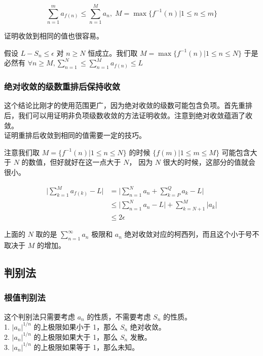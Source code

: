 \[ \sum_{n=1}^{m}a_{f(n)} \le \sum_{n=1}^{M}a_{n}, \; M = \max \{f^{-1}(n) \vert 1 \le n \le m \} \]

证明收敛到相同的值也很容易。

假设 $ L - S_n  \le \epsilon $ 对 $n \ge N$ 恒成立。我们取 $M = \max \{f^{-1}(n) \vert 1 \le n \le N \} $ 
于是必然有 $ \forall n \ge M, \sum_{n=1}^{N} \le \sum_{n=1}^{M}a_{f(n)} \le L $

\subsubsection{绝对收敛的级数重排后保持收敛}
这个结论比刚才的使用范围更广，因为绝对收敛的级数可能包含负项。首先重排后，我们可以用证明非负项级数收敛的方法证明收敛。注意到绝对收敛蕴涵了收敛。\\
证明重排后收敛到相同的值需要一定的技巧。

注意我们取 $M = \{ f^{-1}(n) \vert 1 \le n \le N \} $ 的时候 $ \{ f(m) \vert 1 \le m \le M \}$ 可能包含大于 $N$ 的数值，但好就好在这一点大于 $N$，
因为 $N$ 很大的时候，这部分的值就会很小。

\begin{align*}
\lvert \sum_{k=1}^{M}a_{f(k)} - L \rvert & =  \lvert \sum_{n=1}^{N}a_{n} + \sum_{k=P}^{Q}a_{k} - L \rvert \\
& \le \lvert \sum_{n=1}^{N}a_n - L \rvert + \sum_{k=N+1}^{M}\lvert a_k \rvert \\
& \le 2\epsilon
\end{align*}

上面的 $N$ 取的是 $\sum_{n=1}^{\infty}a_n$ 极限和 $a_n$ 绝对收敛对应的柯西列，而且这个小于号不取决于 $M$ 的增加。


\subsection{判别法}

\subsubsection{根值判别法}
这个判别法只需要考虑 $a_n$ 的性质，不需要考虑 $S_n$ 的性质。\\

1. $\lvert a_n \rvert ^{1/n}$ 的上极限如果小于 1，那么 $S_n$ 绝对收敛。 \\

2. $\lvert a_n \rvert ^{1/n}$ 的上极限如果大于 1，那么 $S_n$ 发散。 \\

3. $\lvert a_n \rvert ^{1/n}$ 的上极限如果等于 1，那么未知。 \\

